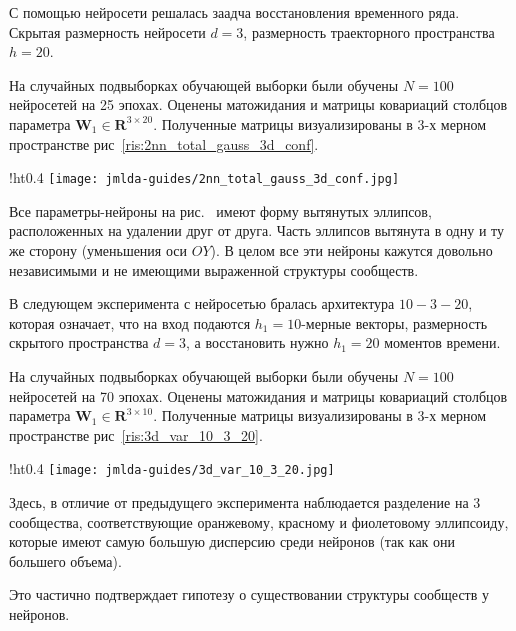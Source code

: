 \documentclass[12pt, twoside]{article}
\begin{document}
С помощью нейросети решалась заадча восстановления временного ряда. Скрытая размерность нейросети $d=3$, размерность траекторного пространства $h=20$.

На случайных подвыборках обучающей выборки были обучены $N=100$ нейросетей на 25 эпохах. Оценены матожидания и матрицы ковариаций столбцов параметра $\mathbf{W}_1 \in \mathbf{R}^{3 \times 20}$. Полученные матрицы визуализированы в 3-х мерном пространстве рис~\ref{ris:2nn_total_gauss_3d_conf}.

\newpage

\begin{wrapfigure}{!ht}{0.4\textwidth}
\texttt{[image: jmlda-guides/2nn\_total\_gauss\_3d\_conf.jpg]}
\caption{Доверительные области 3-х мерных векторов двуслойной нейросети арихитектуры 20-3-20.}
\label{ris:2nn_total_gauss_3d_conf}
\end{wrapfigure}

Все параметры-нейроны на рис.~\cite{ris:2nn_total_gauss_3d_conf} имеют форму вытянутых эллипсов, расположенных на удалении друг от друга. Часть эллипсов вытянута в одну и ту же сторону (уменьшения оси $OY$). В целом все эти нейроны кажутся довольно независимыми и не имеющими выраженной структуры сообществ.

В следующем эксперимента с нейросетью бралась архитектура $10-3-20$, которая означает, что на вход подаются $h_1=10$-мерные векторы, размерность скрытого пространства $d=3$, а восстановить нужно $h_1=20$ моментов времени.

На случайных подвыборках обучающей выборки были обучены $N=100$ нейросетей на 70 эпохах. Оценены матожидания и матрицы ковариаций столбцов параметра $\mathbf{W}_1 \in \mathbf{R}^{3 \times 10}$. Полученные матрицы визуализированы в 3-х мерном пространстве рис~\ref{ris:3d_var_10_3_20}.

\begin{wrapfigure}{!ht}{0.4\textwidth}
\texttt{[image: jmlda-guides/3d\_var\_10\_3\_20.jpg]}
\caption{Доверительные области 3-х мерных векторов двуслойной нейросети арихитектуры 10-3-20.}
\label{ris:3d_var_10_3_20}
\end{wrapfigure}

Здесь, в отличие от предыдущего эксперимента наблюдается разделение на 3 сообщества, соответствующие оранжевому, красному и фиолетовому эллипсоиду, которые имеют самую большую дисперсию среди нейронов (так как они большего объема).

Это частично подтверждает гипотезу о существовании структуры сообществ у нейронов.
\newpage
\end{document}
